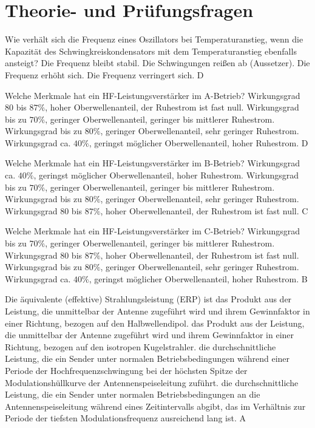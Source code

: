 
\section*{Theorie- und Prüfungsfragen} 

{Wie verhält sich die Frequenz eines Oszillators bei Temperaturanstieg, wenn die Kapazität des Schwingkreiskondensators mit dem Temperaturanstieg ebenfalls ansteigt?}%
{Die Frequenz bleibt stabil.}%
{Die Schwingungen reißen ab (Aussetzer).}%
{Die Frequenz erhöht sich.}%
{Die Frequenz verringert sich.}%
{D}%

{Welche Merkmale hat ein HF-Leistungsverstärker im A-Betrieb?}%
{Wirkungsgrad $80$ bis $87 \%$, hoher Oberwellenanteil, der Ruhestrom ist fast null.}%
{Wirkungsgrad bis zu $70 \%$, geringer Oberwellenanteil, geringer bis mittlerer Ruhestrom.}%
{Wirkungsgrad bis zu $80 \%$, geringer Oberwellenanteil, sehr geringer Ruhestrom.}%
{Wirkungsgrad ca. $40 \%$, geringst möglicher Oberwellenanteil, hoher Ruhestrom.}%
{D}%

{Welche Merkmale hat ein HF-Leistungsverstärker im B-Betrieb?}%
{Wirkungsgrad ca. $40 \%$, geringst möglicher Oberwellenanteil, hoher Ruhestrom.}%
{Wirkungsgrad bis zu $70 \%$, geringer Oberwellenanteil, geringer bis mittlerer Ruhestrom.}%
{Wirkungsgrad bis zu $80 \%$, geringer Oberwellenanteil, sehr geringer Ruhestrom.
}%
{Wirkungsgrad $80$ bis $87 \%$, hoher Oberwellenanteil, der Ruhestrom ist fast null.
}%
{C}%


{ Welche Merkmale hat ein HF-Leistungsverstärker im C-Betrieb?}%
{Wirkungsgrad bis zu $70 \%$, geringer Oberwellenanteil, geringer bis mittlerer Ruhestrom.}%
{Wirkungsgrad $80$ bis $87 \%$, hoher Oberwellenanteil, der Ruhestrom ist fast null.}%
{Wirkungsgrad bis zu $80 \%$, geringer Oberwellenanteil, sehr geringer Ruhestrom.}%
{Wirkungsgrad ca. $40 \%$, geringst möglicher Oberwellenanteil, hoher Ruhestrom.}%
{B}%


{Die äquivalente (effektive) Strahlungsleistung (ERP) ist}%
{das Produkt aus der Leistung, die unmittelbar der Antenne zugeführt wird und ihrem Gewinnfaktor in einer Richtung, bezogen auf den Halbwellendipol.}%
{das Produkt aus der Leistung, die unmittelbar der Antenne zugeführt wird und ihrem Gewinnfaktor in einer Richtung, bezogen auf den isotropen Kugelstrahler.}%
{die durchschnittliche Leistung, die ein Sender unter normalen Betriebsbedingungen während einer Periode der Hochfrequenzschwingung bei der höchsten Spitze der Modulationshüllkurve der Antennenspeiseleitung zuführt.}%
{die durchschnittliche Leistung, die ein Sender unter normalen Betriebsbedingungen an die Antennenspeiseleitung während eines Zeitintervalls abgibt, das im Verhältnis zur Periode der tiefsten Modulationsfrequenz ausreichend lang ist.}%
{A}%

